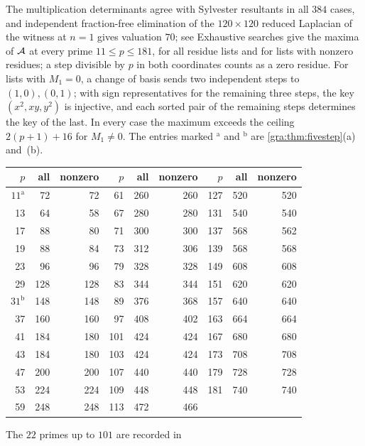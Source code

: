 The multiplication determinants agree with Sylvester resultants in all
$384$ cases, and independent fraction-free elimination of the
$120\times120$ reduced Laplacian of the witness at $n=1$ gives valuation
$70$; see
Exhaustive searches give the maxima of $\mathcal{A}$ at every prime
$11\le p\le181$, for all residue lists and for lists with nonzero
residues; a step divisible by $p$ in both coordinates counts as a zero
residue. For lists with $M_1=0$, a change of basis sends two independent
steps to $(1,0),(0,1)$; with sign representatives for the remaining three
steps, the key $(x^2,xy,y^2)$ is injective, and each sorted pair of the
remaining steps determines the key of the last. In every case the maximum
exceeds the ceiling $2(p+1)+16$ for $M_1\ne0$. The entries marked
$^{\mathrm a}$ and $^{\mathrm b}$ are \cref{gra:thm:fivestep}(a) and~(b).
\begin{center}\small\upshape
\begin{tabular}{rrr@{\qquad}rrr@{\qquad}rrr}
\toprule
$p$ & all & nonzero & $p$ & all & nonzero & $p$ & all & nonzero\\
\midrule
$11^{\mathrm a}$ & 72 & 72 & 61 & 260 & 260 & 127 & 520 & 520\\
13 & 64 & 58 & 67 & 280 & 280 & 131 & 540 & 540\\
17 & 88 & 80 & 71 & 300 & 300 & 137 & 568 & 562\\
19 & 88 & 84 & 73 & 312 & 306 & 139 & 568 & 568\\
23 & 96 & 96 & 79 & 328 & 328 & 149 & 608 & 608\\
29 & 128 & 128 & 83 & 344 & 344 & 151 & 620 & 620\\
$31^{\mathrm b}$ & 148 & 148 & 89 & 376 & 368 & 157 & 640 & 640\\
37 & 160 & 160 & 97 & 408 & 402 & 163 & 664 & 664\\
41 & 184 & 180 & 101 & 424 & 424 & 167 & 680 & 680\\
43 & 184 & 180 & 103 & 424 & 424 & 173 & 708 & 708\\
47 & 200 & 200 & 107 & 440 & 440 & 179 & 728 & 728\\
53 & 224 & 224 & 109 & 448 & 448 & 181 & 740 & 740\\
59 & 248 & 248 & 113 & 472 & 466 & & & \\
\bottomrule
\end{tabular}
\end{center}
The $22$ primes up to $101$ are recorded in
